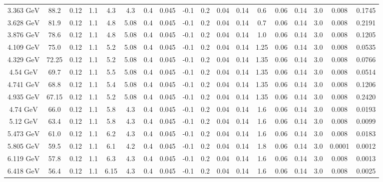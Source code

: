 \documentclass[11pt]{article}
\begin{document}
\begin{table}[htbp]
{\begin{tabular}{cccccccccccccccccc}
				3.363 ${\textrm{GeV}}$ & 88.2 & 0.12 & 1.1 & 4.3 & 4.3 & 0.4 & 0.045 & -0.1 & 0.2 & 0.04 & 0.14 & 0.6 & 0.06 & 0.14 & 3.0 & 0.008 & 0.1745 \\
				3.628 ${\textrm{GeV}}$ & 81.9 & 0.12 & 1.1 & 4.8 & 5.08 & 0.4 & 0.045 & -0.1 & 0.2 & 0.04 & 0.14 & 0.7 & 0.06 & 0.14 & 3.0 & 0.008 & 0.2191 \\
				3.876 ${\textrm{GeV}}$ & 78.6 & 0.12 & 1.1 & 4.8 & 5.08 & 0.4 & 0.045 & -0.1 & 0.2 & 0.04 & 0.14 & 1.0 & 0.06 & 0.14 & 3.0 & 0.008 & 0.1205 \\
				4.109 ${\textrm{GeV}}$ & 75.0 & 0.12 & 1.1 & 5.2 & 5.08 & 0.4 & 0.045 & -0.1 & 0.2 & 0.04 & 0.14 & 1.25 & 0.06 & 0.14 & 3.0 & 0.008 & 0.0535 \\
				4.329 ${\textrm{GeV}}$ & 72.25 & 0.12 & 1.1 & 5.2 & 5.08 & 0.4 & 0.045 & -0.1 & 0.2 & 0.04 & 0.14 & 1.35 & 0.06 & 0.14 & 3.0 & 0.008 & 0.0766 \\
				4.54 ${\textrm{GeV}}$ & 69.7 & 0.12 & 1.1 & 5.5 & 5.08 & 0.4 & 0.045 & -0.1 & 0.2 & 0.04 & 0.14 & 1.35 & 0.06 & 0.14 & 3.0 & 0.008 & 0.0514 \\
				4.741 ${\textrm{GeV}}$ & 68.8 & 0.12 & 1.1 & 5.4 & 5.08 & 0.4 & 0.045 & -0.1 & 0.2 & 0.04 & 0.14 & 1.35 & 0.06 & 0.14 & 3.0 & 0.008 & 0.1206 \\
				4.935 ${\textrm{GeV}}$ & 67.15 & 0.12 & 1.1 & 5.2 & 5.08 & 0.4 & 0.045 & -0.1 & 0.2 & 0.04 & 0.14 & 1.35 & 0.06 & 0.14 & 3.0 & 0.008 & 0.2420 \\
				\midrule
				4.74 ${\textrm{GeV}}$ & 66.0 & 0.12 & 1.1 & 5.8 & 4.3 & 0.4 & 0.045 & -0.1 & 0.2 & 0.04 & 0.14 & 1.6 & 0.06 & 0.14 & 3.0 & 0.008 & 0.0193 \\
				5.12 ${\textrm{GeV}}$ & 63.4 & 0.12 & 1.1 & 5.8 & 4.3 & 0.4 & 0.045 & -0.1 & 0.2 & 0.04 & 0.14 & 1.6 & 0.06 & 0.14 & 3.0 & 0.008 & 0.0099 \\
				5.473 ${\textrm{GeV}}$ & 61.0 & 0.12 & 1.1 & 6.2 & 4.3 & 0.4 & 0.045 & -0.1 & 0.2 & 0.04 & 0.14 & 1.6 & 0.06 & 0.14 & 3.0 & 0.008 & 0.0183 \\
				5.805 ${\textrm{GeV}}$ & 59.5 & 0.12 & 1.1 & 6.1 & 4.2 & 0.4 & 0.045 & -0.1 & 0.2 & 0.04 & 0.14 & 1.8 & 0.06 & 0.14 & 3.0 & 0.0001 & 0.0012 \\
				6.119 ${\textrm{GeV}}$ & 57.8 & 0.12 & 1.1 & 6.3 & 4.3 & 0.4 & 0.045 & -0.1 & 0.2 & 0.04 & 0.14 & 1.6 & 0.06 & 0.14 & 3.0 & 0.008 & 0.0013 \\
				6.418 ${\textrm{GeV}}$ & 56.4 & 0.12 & 1.1 & 6.15 & 4.3 & 0.4 & 0.045 & -0.1 & 0.2 & 0.04 & 0.14 & 1.6 & 0.06 & 0.14 & 3.0 & 0.008 & 0.0025 \\

\end{tabular}}
\end{table}
\end{document}
